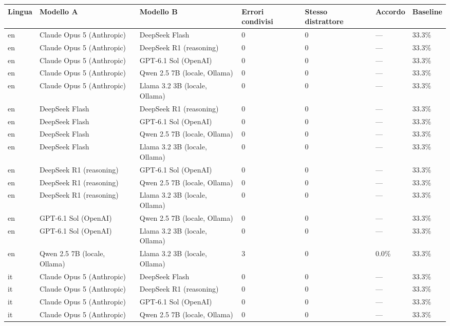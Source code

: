 \begin{table}[htbp]
\centering\small
\begin{tabularx}{\textwidth}{lXXXXXX}
\toprule
Lingua & Modello A & Modello B & Errori condivisi & Stesso distrattore & Accordo & Baseline \\
\midrule
en & Claude Opus 5 (Anthropic) & DeepSeek Flash & 0 & 0 & — & 33.3\% \\
en & Claude Opus 5 (Anthropic) & DeepSeek R1 (reasoning) & 0 & 0 & — & 33.3\% \\
en & Claude Opus 5 (Anthropic) & GPT-6.1 Sol (OpenAI) & 0 & 0 & — & 33.3\% \\
en & Claude Opus 5 (Anthropic) & Qwen 2.5 7B (locale, Ollama) & 0 & 0 & — & 33.3\% \\
en & Claude Opus 5 (Anthropic) & Llama 3.2 3B (locale, Ollama) & 0 & 0 & — & 33.3\% \\
en & DeepSeek Flash & DeepSeek R1 (reasoning) & 0 & 0 & — & 33.3\% \\
en & DeepSeek Flash & GPT-6.1 Sol (OpenAI) & 0 & 0 & — & 33.3\% \\
en & DeepSeek Flash & Qwen 2.5 7B (locale, Ollama) & 0 & 0 & — & 33.3\% \\
en & DeepSeek Flash & Llama 3.2 3B (locale, Ollama) & 0 & 0 & — & 33.3\% \\
en & DeepSeek R1 (reasoning) & GPT-6.1 Sol (OpenAI) & 0 & 0 & — & 33.3\% \\
en & DeepSeek R1 (reasoning) & Qwen 2.5 7B (locale, Ollama) & 0 & 0 & — & 33.3\% \\
en & DeepSeek R1 (reasoning) & Llama 3.2 3B (locale, Ollama) & 0 & 0 & — & 33.3\% \\
en & GPT-6.1 Sol (OpenAI) & Qwen 2.5 7B (locale, Ollama) & 0 & 0 & — & 33.3\% \\
en & GPT-6.1 Sol (OpenAI) & Llama 3.2 3B (locale, Ollama) & 0 & 0 & — & 33.3\% \\
en & Qwen 2.5 7B (locale, Ollama) & Llama 3.2 3B (locale, Ollama) & 3 & 0 & 0.0\% & 33.3\% \\
it & Claude Opus 5 (Anthropic) & DeepSeek Flash & 0 & 0 & — & 33.3\% \\
it & Claude Opus 5 (Anthropic) & DeepSeek R1 (reasoning) & 0 & 0 & — & 33.3\% \\
it & Claude Opus 5 (Anthropic) & GPT-6.1 Sol (OpenAI) & 0 & 0 & — & 33.3\% \\
it & Claude Opus 5 (Anthropic) & Qwen 2.5 7B (locale, Ollama) & 0 & 0 & — & 33.3\% \\

\end{tabularx}
\end{table}
